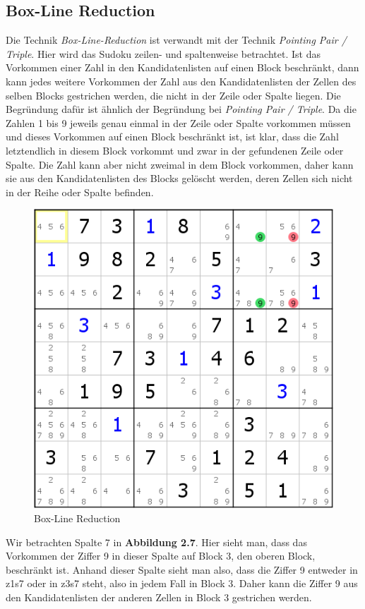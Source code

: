\newpage
\subsection{Box-Line Reduction}
Die Technik \textit{Box-Line-Reduction} ist verwandt mit der Technik \textit{Pointing Pair / Triple}. Hier wird das Sudoku zeilen- und spaltenweise betrachtet. Ist das Vorkommen einer Zahl in den Kandidatenlisten auf einen Block beschränkt, dann kann jedes weitere Vorkommen der Zahl aus den Kandidatenlisten der Zellen des selben Blocks gestrichen werden, die nicht in der Zeile oder Spalte liegen. Die Begründung dafür ist ähnlich der Begründung bei \textit{Pointing Pair / Triple}. Da die Zahlen 1 bis 9 jeweils genau einmal in der Zeile oder Spalte vorkommen müssen und dieses Vorkommen auf einen Block beschränkt ist, ist klar, dass die Zahl letztendlich in diesem Block vorkommt und zwar in der gefundenen Zeile oder Spalte. Die Zahl kann aber nicht zweimal in dem Block vorkommen, daher kann sie aus den Kandidatenlisten des Blocks gelöscht werden, deren Zellen sich nicht in der Reihe oder Spalte befinden.

\begin{figure}[h]
\begin{center}
\includegraphics{./img/box_line_reduction.png}
\caption{Box-Line Reduction}
\end{center}
\end{figure}

\noindent Wir betrachten Spalte 7 in \textbf{Abbildung 2.7}. Hier sieht man, dass das Vorkommen der Ziffer 9 in dieser Spalte auf Block 3, den oberen Block, beschränkt ist. Anhand dieser Spalte sieht man also, dass die Ziffer 9 entweder in z1s7 oder in z3s7 steht, also in jedem Fall in Block 3. Daher kann die Ziffer 9 aus den Kandidatenlisten der anderen Zellen in Block 3 gestrichen werden.
